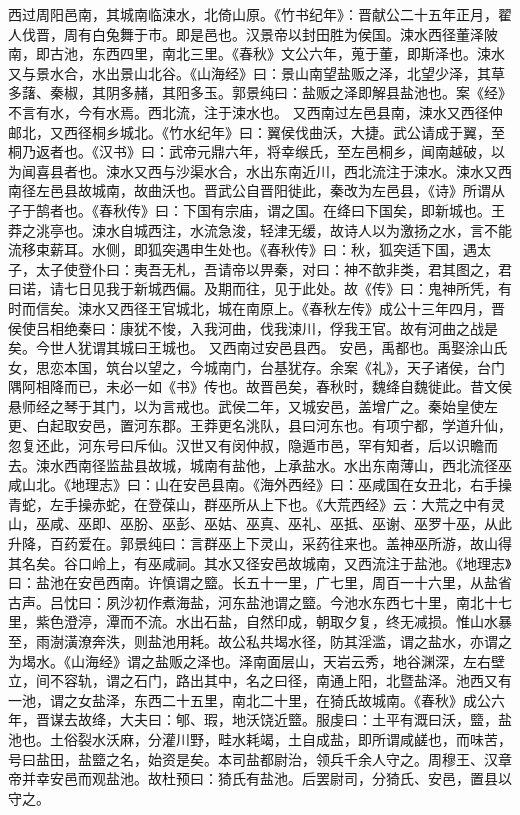 \documentclass[12pt,UTF8]{ctexbook}
\begin{document}
西过周阳邑南，其城南临涑水，北倚山原。《竹书纪年》：晋献公二十五年正月，翟人伐晋，周有白兔舞于市。即是邑也。汉景帝以封田胜为侯国。涑水西径董泽陂南，即古池，东西四里，南北三里。《春秋》文公六年，蒐于董，即斯泽也。涑水又与景水合，水出景山北谷。《山海经》曰：景山南望盐贩之泽，北望少泽，其草多藷、秦椒，其阴多赭，其阳多玉。郭景纯曰：盐贩之泽即解县盐池也。案《经》不言有水，今有水焉。西北流，注于涑水也。
又西南过左邑县南，涑水又西径仲邮北，又西径桐乡城北。《竹水纪年》曰：翼侯伐曲沃，大捷。武公请成于翼，至桐乃返者也。《汉书》曰：武帝元鼎六年，将幸缑氏，至左邑桐乡，闻南越破，以为闻喜县者也。涑水又西与沙渠水合，水出东南近川，西北流注于涑水。涑水又西南径左邑县故城南，故曲沃也。晋武公自晋阳徙此，秦改为左邑县，《诗》所谓从子于鹄者也。《春秋传》曰：下国有宗庙，谓之国。在绛曰下国矣，即新城也。王莽之洮亭也。涑水自城西注，水流急浚，轻津无缓，故诗人以为激扬之水，言不能流移束薪耳。水侧，即狐突遇申生处也。《春秋传》曰：秋，狐突适下国，遇太子，太子使登仆曰：夷吾无札，吾请帝以畀秦，对曰：神不歆非类，君其图之，君曰诺，请七日见我于新城西偏。及期而往，见于此处。故《传》曰：鬼神所凭，有时而信矣。涑水又西径王官城北，城在南原上。《春秋左传》成公十三年四月，晋侯使吕相绝秦曰：康犹不悛，入我河曲，伐我涑川，俘我王官。故有河曲之战是矣。今世人犹谓其城曰王城也。
又西南过安邑县西。
安邑，禹都也。禹娶涂山氏女，思恋本国，筑台以望之，今城南门，台基犹存。余案《礼》，天子诸侯，台门隅阿相降而已，未必一如《书》传也。故晋邑矣，春秋时，魏绛自魏徙此。昔文侯悬师经之琴于其门，以为言戒也。武侯二年，又城安邑，盖增广之。秦始皇使左更、白起取安邑，置河东郡。王莽更名洮队，县曰河东也。有项宁都，学道升仙，忽复还此，河东号曰斥仙。汉世又有闵仲叔，隐遁市邑，罕有知者，后以识瞻而去。涑水西南径监盐县故城，城南有盐他，上承盐水。水出东南薄山，西北流径巫咸山北。《地理志》曰：山在安邑县南。《海外西经》曰：巫咸国在女丑北，右手操青蛇，左手操赤蛇，在登葆山，群巫所从上下也。《大荒西经》云：大荒之中有灵山，巫咸、巫即、巫朌、巫彭、巫姑、巫真、巫礼、巫抵、巫谢、巫罗十巫，从此升降，百药爱在。郭景纯曰：言群巫上下灵山，采药往来也。盖神巫所游，故山得其名矣。谷口岭上，有巫咸祠。其水又径安邑故城南，又西流注于盐池。《地理志》曰：盐池在安邑西南。许慎谓之盬。长五十一里，广七里，周百一十六里，从盐省古声。吕忱曰：夙沙初作煮海盐，河东盐池谓之盬。今池水东西七十里，南北十七里，紫色澄渟，潭而不流。水出石盐，自然印成，朝取夕复，终无减损。惟山水暴至，雨澍潢潦奔泆，则盐池用耗。故公私共堨水径，防其淫滥，谓之盐水，亦谓之为堨水。《山海经》谓之盐贩之泽也。泽南面层山，天岩云秀，地谷渊深，左右壁立，间不容轨，谓之石门，路出其中，名之曰径，南通上阳，北暨盐泽。池西又有一池，谓之女盐泽，东西二十五里，南北二十里，在猗氏故城南。《春秋》成公六年，晋谋去故绛，大夫曰：郇、瑕，地沃饶近盬。服虔曰：土平有溉曰沃，盬，盐池也。土俗裂水沃麻，分灌川野，畦水耗竭，土自成盐，即所谓咸鹾也，而味苦，号曰盐田，盐盬之名，始资是矣。本司盐都尉治，领兵千余人守之。周穆王、汉章帝并幸安邑而观盐池。故杜预曰：猗氏有盐池。后罢尉司，分猗氏、安邑，置县以守之。
\end{document}
